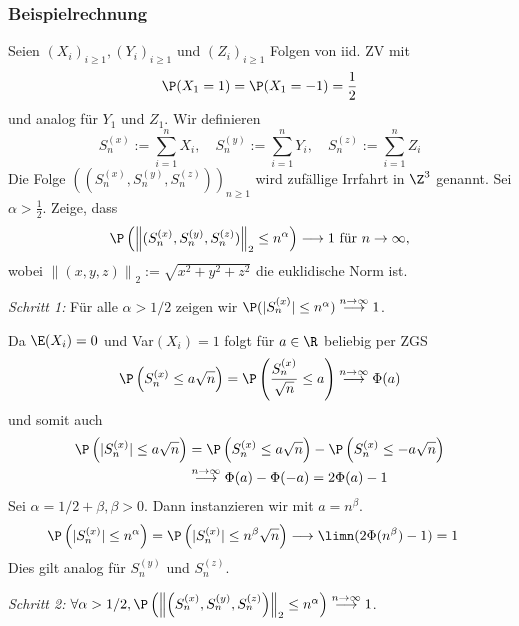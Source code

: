 \subsubsection*{Beispielrechnung}

Seien $(X_i)_{i \geq 1}, (Y_i)_{i \geq 1}$ und $(Z_i)_{i \geq 1}$ Folgen von iid. ZV mit
$$\P(X_1 = 1) = \P(X_1 = -1) = \frac{1}{2}$$
und analog für $Y_1$ und $Z_1$. Wir definieren
$$S_n^{(x)} := \sum_{i=1}^n X_i, \quad S_n^{(y)} := \sum_{i=1}^n Y_i, \quad S_n^{(z)} := \sum_{i=1}^n Z_i$$
Die Folge $\left((S_n^{(x)}, S_n^{(y)}, S_n^{(z)})\right)_{n \geq 1}$ wird zufällige Irrfahrt in $\Z^3$ genannt. Sei $\alpha > \frac{1}{2}$. Zeige, dass
$$\P\left(\left\lVert(S_n^{(x)}, S_n^{(y)}, S_n^{(z)})\right\rVert_2 \leq n^\alpha\right) \longrightarrow 1 \text{ für } n \to \infty,$$
wobei $\left\lVert(x,y,z)\right\rVert_2 := \sqrt{x^2+y^2+z^2}$ die euklidische Norm ist.

\textit{Schritt 1: } Für alle $\alpha > 1/2$ zeigen wir $\P(|S_n^{(x)}| \leq n^\alpha) \overset{n \to \infty}{\longrightarrow} 1$.

Da $\E(X_i) = 0$ und Var$(X_i) = 1$ folgt für $a \in \R$ beliebig per ZGS
$$\P\left(S_n^{(x)} \leq a \sqrt{n}\right) = \P\left(\frac{S_n^{(x)}}{\sqrt{n}} \leq a\right) \overset{n \to \infty}{\longrightarrow} \Phi(a)$$
und somit auch
\begin{align*}
    \P\left(|S_n^{(x)}| \leq a\sqrt{n}\right) &= \P\left(S_n^{(x)} \leq a \sqrt{n}\right) -\P\left(S_n^{(x)} \leq - a \sqrt{n}\right) \\
    &\overset{n \to \infty}{\longrightarrow} \Phi(a) - \Phi(-a) = 2\Phi(a)-1
\end{align*}
Sei $\alpha = 1/2 + \beta, \beta > 0$. Dann instanzieren wir mit $a = n^\beta$.
\begin{align*}
    \P\left(|S_n^{(x)}| \leq n^\alpha\right) &= \P\left(|S_n^{(x)}| \leq n^\beta\sqrt{n}\right) \longrightarrow \limn(2 \Phi(n^\beta)-1) = 1
\end{align*}
Dies gilt analog für $S_n^{(y)}$ und $S_n^{(z)}$.

\textit{Schritt 2:} $\forall \alpha > 1/2, \P\left(\left\lVert\left(S_n^{(x)}, S_n^{(y)}, S_n^{(z)}\right)\right\rVert_2 \leq n^\alpha\right) \overset{n \to \infty}{\longrightarrow} 1$.


